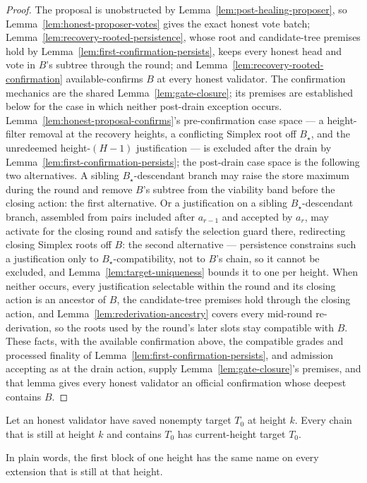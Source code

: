 \begin{proof}
The proposal is unobstructed by Lemma~\ref{lem:post-healing-proposer}, so
Lemma~\ref{lem:honest-proposer-votes} gives the exact honest vote batch;
Lemma~\ref{lem:recovery-rooted-persistence}, whose root and candidate-tree
premises hold by Lemma~\ref{lem:first-confirmation-persists}, keeps every
honest head and vote in \(B\)'s subtree through the round; and
Lemma~\ref{lem:recovery-rooted-confirmation} available-confirms \(B\) at
every honest validator.  The confirmation mechanics are the shared
Lemma~\ref{lem:gate-closure}; its premises are established below for
the case in which neither post-drain exception occurs.
Lemma~\ref{lem:honest-proposal-confirms}'s pre-confirmation case space
--- a height-filter removal at the recovery heights, a conflicting
Simplex root off \(B_\star\), and the unredeemed
height-\((H{-}1)\) justification --- is excluded after the drain by
Lemma~\ref{lem:first-confirmation-persists}; the post-drain case space
is the following two alternatives.  A sibling
\(B_\star\)-descendant branch may raise the store maximum during the
round and remove \(B\)'s subtree from the viability band before the
closing action: the first alternative.  Or a justification on a sibling
\(B_\star\)-descendant branch, assembled from pairs included after
\(a_{r-1}\) and accepted by \(a_r\), may activate for the closing
round and satisfy the selection guard there, redirecting closing
Simplex roots off \(B\): the second alternative --- persistence
constrains such a justification only to \(B_\star\)-compatibility, not
to \(B\)'s chain, so it cannot be excluded, and
Lemma~\ref{lem:target-uniqueness} bounds it to one per height.  When
neither occurs, every justification selectable within the round and its
closing action is an ancestor of \(B\), the candidate-tree premises
hold through the closing action, and
Lemma~\ref{lem:rederivation-ancestry} covers every mid-round
re-derivation, so the roots used by
the round's later slots stay compatible with \(B\).  These facts, with
the available confirmation above, the compatible grades and processed
finality of Lemma~\ref{lem:first-confirmation-persists}, and admission
accepting as at the drain action, supply
Lemma~\ref{lem:gate-closure}'s premises, and that lemma gives every
honest validator an official confirmation whose deepest contains
\(B\).
\end{proof}

\begin{lemma}
\label{lem:saved-target-transfers}
Let an honest validator have saved nonempty target \(T_0\) at height \(k\).
Every chain that is still at height \(k\) and contains \(T_0\) has
current-height target \(T_0\).

In plain words, the first block of one height has the same name on every
extension that is still at that height.
\end{lemma}


